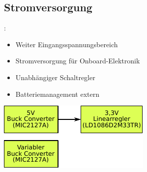 \documentclass{beamer}
\begin{document}
\subsection{Stromversorgung}
\begin{frame}{\insertsection: \insertsubsection}
\begin{minipage}{0.45\linewidth}
	\begin{itemize}
		\item Weiter Eingangsspannungsbereich
		\item Stromversorgung für Onboard-Elektronik
		\item Unabhängiger Schaltregler
		\item Batteriemanagement extern
	\end{itemize}
\end{minipage} \quad
\begin{minipage}{0.45\linewidth}
	\includegraphics[width=\linewidth]{stromversorgung}
\end{minipage}
\end{frame}
\end{document}
